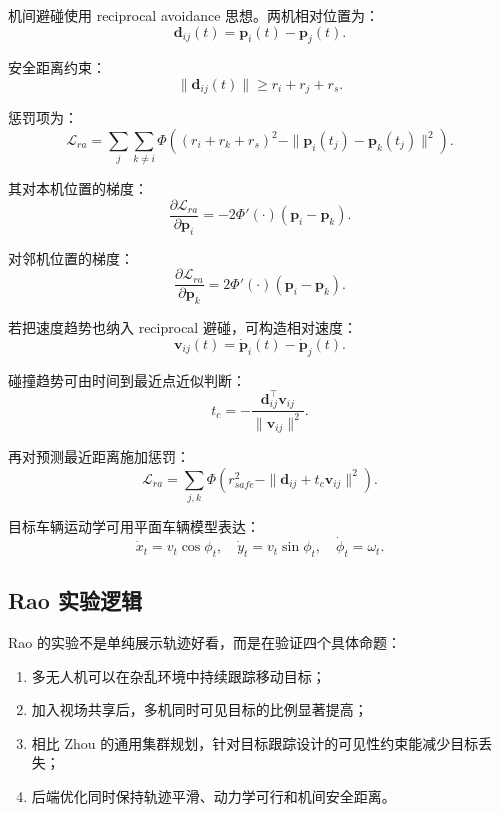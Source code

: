 ﻿\documentclass[UTF8,a4paper,11pt]{ctexart}
\begin{document}
机间避碰使用 reciprocal avoidance 思想。两机相对位置为：
\begin{equation}
\bm d_{ij}(t)=\bm p_i(t)-\bm p_j(t).
\tag{38}
\end{equation}

安全距离约束：
\begin{equation}
\|\bm d_{ij}(t)\|\geq r_i+r_j+r_s .
\tag{39}
\end{equation}

惩罚项为：
\begin{equation}
\mathcal L_{ra}=\sum_j\sum_{k\neq i}
\Phi\left((r_i+r_k+r_s)^2-\|\bm p_i(t_j)-\bm p_k(t_j)\|^2\right).
\tag{40}
\end{equation}

其对本机位置的梯度：
\begin{equation}
\frac{\partial \mathcal L_{ra}}{\partial \bm p_i}
=-2\Phi'(\cdot)(\bm p_i-\bm p_k).
\tag{41}
\end{equation}

对邻机位置的梯度：
\begin{equation}
\frac{\partial \mathcal L_{ra}}{\partial \bm p_k}
=2\Phi'(\cdot)(\bm p_i-\bm p_k).
\tag{42}
\end{equation}

若把速度趋势也纳入 reciprocal 避碰，可构造相对速度：
\begin{equation}
\bm v_{ij}(t)=\dot{\bm p}_i(t)-\dot{\bm p}_j(t).
\tag{43}
\end{equation}

碰撞趋势可由时间到最近点近似判断：
\begin{equation}
t_c=-\frac{\bm d_{ij}^\top\bm v_{ij}}{\|\bm v_{ij}\|^2}.
\tag{44}
\end{equation}

再对预测最近距离施加惩罚：
\begin{equation}
\mathcal L_{ra}=\sum_{j,k}
\Phi\left(r_{safe}^2-\|\bm d_{ij}+t_c\bm v_{ij}\|^2\right).
\tag{45}
\end{equation}

目标车辆运动学可用平面车辆模型表达：
\begin{equation}
\dot{x}_t=v_t\cos\phi_t,\quad
\dot{y}_t=v_t\sin\phi_t,\quad
\dot{\phi}_t=\omega_t .
\tag{46}
\end{equation}

\subsection{Rao 实验逻辑}

Rao 的实验不是单纯展示轨迹好看，而是在验证四个具体命题：
\begin{enumerate}
  \item 多无人机可以在杂乱环境中持续跟踪移动目标；
  \item 加入视场共享后，多机同时可见目标的比例显著提高；
  \item 相比 Zhou 的通用集群规划，针对目标跟踪设计的可见性约束能减少目标丢失；
  \item 后端优化同时保持轨迹平滑、动力学可行和机间安全距离。
\end{enumerate}
\end{document}
